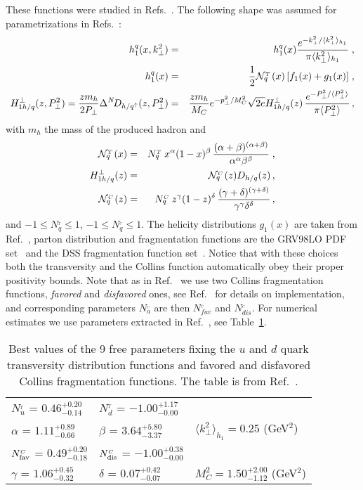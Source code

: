 \documentclass[a4paper,11pt]{article}
\newcommand{\ba}{\begin{eqnarray}}
\newcommand{\ea}{\end{eqnarray}}
\newcommand{\la}{\langle}
\newcommand{\ra}{\rangle}
\newcommand{\mh}{ m_h }
\def\T{_{_T}}
\def\C{_{_C}}
\def\kperp{k_\perp}
\def\pperp{P_\perp}
\def\avkperp{\la \kperp^2 \ra}
\def\avpperp{\la \pperp^2 \ra}
\begin{document}
These functions were studied in
Refs.~\cite{Anselmino:2007fs,Anselmino:2008jk,Anselmino:2013vqa,
Kang:2014zza,Kang:2015msa,Anselmino:2015sxa}.
The following shape was assumed for parametrizations in
Refs.~\cite{Anselmino:2007fs,Anselmino:2008jk,Anselmino:2013vqa}:
 \ba
h_{1}^{q} (x, \kperp^2) &=&h_{1}^{q} (x)  \frac{e^{-{\kperp^2}/{\avkperp_{h_1} }}}{\pi \avkperp_{h_1}} \; ,\label{tr-funct}\\
h_{1}^{q} (x) &=&\frac{1}{2} {\cal N}^{\T}_q(x)\,
[f_{1}(x)+g_1(x)]\; ,\\
H_{1 h/q}^{\perp}(z, \pperp^2) = \frac{z \mh}{2 \pperp} \Delta^N \! D_{h/q^\uparrow}(z,\pperp^2) &=&  \frac{z \mh}{M_C} e^{-p_{\perp}^2/M_C^2} \sqrt{2 e} H_{1 h/q}^{\perp}(z) \,\frac{e^{-\pperp^2/{\avpperp}}}{\pi \avpperp}\,,
\label{coll-funct}
 \ea
 with $\mh$ the mass of the produced hadron and
 \ba
 {\cal N}^{\T}_q(x) &=& N^{\T}_q
\,x^{\alpha} (1-x)^{\beta} \, \frac{(\alpha + \beta)^{(\alpha
+\beta)}} {\alpha^{\alpha} \beta^{\beta}}\; ,
\\
H_{1 h/q}^{\perp}(z) &=&  {\cal N}^{\C}_q(z) D_{h/q}(z)\, , \\
{\cal N}^{\C}_q(z) &=& N^{\C}_q \, z^{\gamma} (1-z)^{\delta} \,
\frac{(\gamma + \delta)^{(\gamma +\delta)}}
{\gamma^{\gamma} \delta^{\delta}}\, ,
 \ea
and $-1\le N^{\T}_q\le 1$, $-1 \le N^{\C}_q \le 1$. The helicity distributions $g_1(x)$ are taken
from Ref.~\cite{Gluck:2000dy}, parton distribution and fragmentation functions are the GRV98LO PDF set~\cite{Gluck:1998xa} and the
DSS fragmentation function set~\cite{deFlorian:2007aj}. Notice that with these choices both
the transversity and the Collins function automatically obey their
proper positivity bounds. Note that as in Ref.~\cite{Anselmino:2013vqa} we use two
Collins fragmentation functions, {\it favored} and {\it disfavored} ones, see Ref.~\cite{Anselmino:2013vqa} for details on implementation, and corresponding parameters ${N}^{\C}_a$ are then  ${N}^{\C}_{fav}$ and ${N}^{\C}_{dis}$. For numerical estimates we use parameters extracted in Ref.~\cite{Anselmino:2013vqa}, see Table~\ref{fitpar}.

\begin{table}[t]
\centering
\renewcommand{\tabcolsep}{0.4pc} %
\renewcommand{\arraystretch}{1.2} %
\begin{tabular}{@{ }lll}
 \hline
 $N_{u}^{\T}$ = $0.46^{+0.20}_{-0.14}$ & $N_{d}^{\T}$ = $ -1.00^{+1.17}_{-0.00}$ \\
 $\alpha$ =  $1.11^{+0.89}_{-0.66}$ & $\beta$  = $3.64^{+5.80}_{-3.37}$ &
 $\avkperp_{h_1} = 0.25$ (GeV$^2$) \\
 \hline
 $N_{\rm fav}^{\C}$  = $0.49^{+0.20}_{-0.18}$ & $N_{\rm dis}^{\C}$  =
 $-1.00^{+0.38}_{-0.00}$ \\
 $\gamma$  = $1.06^{+0.45}_{-0.32}$  & $\delta$   = $0.07^{+0.42}_{-0.07}$  &
 $M^2_C = 1.50^{+2.00}_{-1.12}$ (GeV$^2$) \\
 \hline
\end{tabular}
	\caption{Best values of the 9 free parameters fixing
	the $u$ and $d$ quark transversity distribution functions and
	favored and disfavored Collins fragmentation functions.
	The table is from Ref.~\cite{Anselmino:2013vqa}.
\label{fitpar}}
\end{table}
\end{document}
